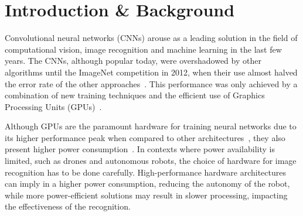 \documentclass[
    12pt,                       %
    oneside,                    %
    a4paper,                    %
    brazil,                     %
    french,                     %
    spanish,                    %
    english,                    %
    ]{abntex2}
\begin{document}
\tableofcontents*
\cleardoublepage


\textual


\chapter[Introduction \& Background]{Introduction \& Background}

Convolutional neural networks (CNNs) arouse as a leading solution in the field of computational vision, image recognition and machine learning in the last few years. The CNNs, although popular today, were overshadowed by other algorithms until the ImageNet competition in 2012, when their use almost halved the error rate of the other approaches~\cite{NIPS2012_4824}. This performance was only achieved by a combination of new training techniques and the efficient use of Graphics Processing Units (GPUs)~\cite{LeCun2015}.

Although GPUs are the paramount hardware for training neural networks due to its higher performance peak when compared to other architectures~\cite{Zhang2017, Nurvitadhi2017_1}, they also present higher power consumption~\cite{Sun2017}. In contexts where power availability is limited, such as drones and autonomous robots, the choice of hardware for image recognition has to be done carefully. High-performance hardware architectures can imply in a higher power consumption, reducing the autonomy of the robot, while more power-efficient solutions may result in slower processing, impacting the effectiveness of the recognition.
\end{document}
